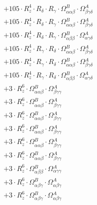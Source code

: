 \documentclass{article}
\begin{document}
\begin{subequations}
\begin{gather}
\begin{array}{c}
 \\[0.2em] 		 + 105 \cdot R_{z}^{4} \cdot R_{\delta{}} \cdot R_{\gamma{}} \cdot \Omega{}^{B}_{\alpha{}\alpha{}\beta{}} \cdot \Omega{}^{A}_{\beta{}\gamma{}\delta{}} 
 \\[0.2em] 		 + 105 \cdot R_{z}^{4} \cdot R_{\delta{}} \cdot R_{\gamma{}} \cdot \Omega{}^{B}_{\alpha{}\alpha{}\beta{}} \cdot \Omega{}^{A}_{\beta{}\gamma{}\delta{}} 
 \\[0.2em] 		 + 105 \cdot R_{z}^{4} \cdot R_{\delta{}} \cdot R_{\gamma{}} \cdot \Omega{}^{B}_{\alpha{}\beta{}\beta{}} \cdot \Omega{}^{A}_{\alpha{}\gamma{}\delta{}} 
 \\[0.2em] 		 + 105 \cdot R_{z}^{4} \cdot R_{\gamma{}} \cdot R_{\delta{}} \cdot \Omega{}^{B}_{\alpha{}\alpha{}\beta{}} \cdot \Omega{}^{A}_{\beta{}\gamma{}\delta{}} 
 \\[0.2em] 		 + 105 \cdot R_{z}^{4} \cdot R_{\gamma{}} \cdot R_{\delta{}} \cdot \Omega{}^{B}_{\alpha{}\alpha{}\beta{}} \cdot \Omega{}^{A}_{\beta{}\gamma{}\delta{}} 
 \\[0.2em] 		 + 105 \cdot R_{z}^{4} \cdot R_{\gamma{}} \cdot R_{\delta{}} \cdot \Omega{}^{B}_{\alpha{}\beta{}\beta{}} \cdot \Omega{}^{A}_{\alpha{}\gamma{}\delta{}} 
 \\[0.2em] 		 + 3 \cdot R_{z}^{6} \cdot \Omega{}^{B}_{\alpha{}\alpha{}\beta{}} \cdot \Omega{}^{A}_{\beta{}\gamma{}\gamma{}} 
 \\[0.2em] 		 + 3 \cdot R_{z}^{6} \cdot \Omega{}^{B}_{\alpha{}\alpha{}\beta{}} \cdot \Omega{}^{A}_{\beta{}\gamma{}\gamma{}} 
 \\[0.2em] 		 + 3 \cdot R_{z}^{6} \cdot \Omega{}^{B}_{\alpha{}\alpha{}\beta{}} \cdot \Omega{}^{A}_{\beta{}\gamma{}\gamma{}} 
 \\[0.2em] 		 + 3 \cdot R_{z}^{6} \cdot \Omega{}^{B}_{\alpha{}\alpha{}\beta{}} \cdot \Omega{}^{A}_{\beta{}\gamma{}\gamma{}} 
 \\[0.2em] 		 + 3 \cdot R_{z}^{6} \cdot \Omega{}^{B}_{\alpha{}\alpha{}\beta{}} \cdot \Omega{}^{A}_{\beta{}\gamma{}\gamma{}} 
 \\[0.2em] 		 + 3 \cdot R_{z}^{6} \cdot \Omega{}^{B}_{\alpha{}\alpha{}\beta{}} \cdot \Omega{}^{A}_{\beta{}\gamma{}\gamma{}} 
 \\[0.2em] 		 + 3 \cdot R_{z}^{6} \cdot \Omega{}^{B}_{\alpha{}\beta{}\beta{}} \cdot \Omega{}^{A}_{\alpha{}\gamma{}\gamma{}} 
 \\[0.2em] 		 + 3 \cdot R_{z}^{6} \cdot \Omega{}^{B}_{\alpha{}\beta{}\gamma{}} \cdot \Omega{}^{A}_{\alpha{}\beta{}\gamma{}} 
 \\[0.2em] 		 + 3 \cdot R_{z}^{6} \cdot \Omega{}^{B}_{\alpha{}\beta{}\gamma{}} \cdot \Omega{}^{A}_{\alpha{}\beta{}\gamma{}} 

\end{array}
\end{gather}
\end{subequations}
\end{document}
